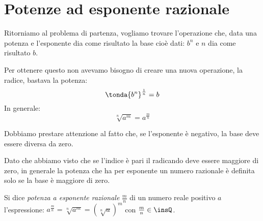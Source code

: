 \begin{comment}
\begin{esempio}
 Determina le condizioni di esistenza della radice 
 \(\sqrt[4]{\dfrac{x-1}{x+1}}\).

C.E. \(\dfrac{x-1}{x+1}\ge 0\). 
Occorre discutere il segno della frazione \(f\), combinando il segno del 
numeratore \(N\) e del denominatore \(D\):

\begin{center}
 
\end{center}
Pertanto C.E. \(x<-1\vee x\ge 1\).
\end{esempio}


\end{comment}

\section{Potenze ad esponente razionale}
\label{sec:radicali_esp_razionale}

Ritorniamo al problema di partenza, vogliamo trovare l'operazione che, data 
una potenza e l'esponente dia come risultato la base cioè dati: \(b^n\) e 
\(n\) dia come risultato \(b\).

Per ottenere questo non avevamo bisogno di creare una nuova operazione, la 
radice, bastava la potenza:
\[\tonda{b^n}^\frac{1}{n}=b\]
In generale:
\[\sqrt[n]{a^m}=a^\frac{m}{n}\]
\begin{osservazione}
 Dobbiamo prestare attenzione al fatto che, se l'esponente è negativo, la 
base deve essere diversa da zero.
\end{osservazione}

\begin{osservazione}
Dato che abbiamo visto che se l'indice è pari il radicando deve essere 
maggiore di zero, in generale la potenza che ha per esponente un numero 
razionale è definita solo se la base è maggiore di zero.
\end{osservazione}

\begin{definizione}
Si dice \emph{potenza a esponente razionale} \(\frac m n\) di un numero reale 
positivo \(a\) l'espressione:
 \(a^{\frac m n}=\sqrt[n]{a^m}=\left(\sqrt[n]a\right)^m\) con 
 \(\frac m n\in \insQ\).
\end{definizione}

